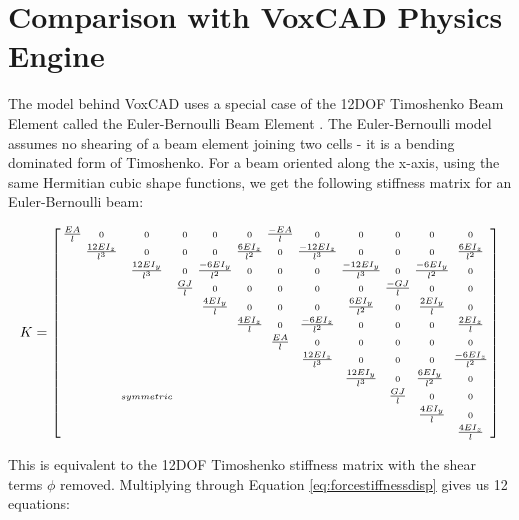 {\section{Comparison with VoxCAD Physics Engine}

The model behind VoxCAD uses a special case of the 12DOF Timoshenko Beam Element called the Euler-Bernoulli Beam Element \cite{Hiller2014a}.  The Euler-Bernoulli model assumes no shearing of a beam element joining two cells - it is a bending dominated form of Timoshenko.  For a beam oriented along the x-axis, using the same Hermitian cubic shape functions, we get the following stiffness matrix for an Euler-Bernoulli beam:

\[ K =  \small {\left[ \begin{smallmatrix}
\tfrac{EA}{l} & 0 & 0 & 0 & 0 & 0 & \tfrac{-EA}{l} & 0 & 0 & 0 & 0 & 0\\
 & \tfrac{12EI_z}{l^3} & 0 & 0 & 0 & \tfrac{6EI_z}{l^2} & 0 & \tfrac{-12EI_z}{l^3} & 0 & 0 & 0 & \tfrac{6EI_z}{l^2}\\
 &  & \tfrac{12EI_y}{l^3} & 0 & \tfrac{-6EI_y}{l^2} & 0 & 0 & 0 & \tfrac{-12EI_y}{l^3} & 0 & \tfrac{-6EI_y}{l^2} & 0\\
 &  &  &  \tfrac{GJ}{l} &  0 &  0 &  0 &  0 &  0 & \tfrac{-GJ}{l} & 0 & 0\\
 &  &  &  & \tfrac{4EI_y}{l} & 0 & 0 & 0 & \tfrac{6EI_y}{l^2} & 0 & \tfrac{2EI_y}{l} & 0\\
 &  &  &  &  & \tfrac{4EI_z}{l} & 0 & \tfrac{-6EI_z}{l^2} & 0 & 0 & 0 & \tfrac{2EI_z}{l}\\
 &  &  &  &  &  & \tfrac{EA}{l}  & 0 & 0 & 0 & 0 & 0\\
 &  &  &  &  &  &  & \tfrac{12EI_z}{l^3} & 0 & 0 & 0 & \tfrac{-6EI_z}{l^2}\\
 &  &  &  &  &  &  &  & \tfrac{12EI_y}{l^3} & 0 & \tfrac{6EI_y}{l^2}\ & 0\\
 &  & symmetric &  &  &  &  &  &  & \tfrac{GJ}{l} & 0 & 0\\
 &  &  &  &  &  &  &  &  &  & \tfrac{4EI_y}{l} & 0\\
  &  &  &  &  &  &  &  &  &  &  & \tfrac{4EI_z}{l}\\
 \end{smallmatrix} \right] } \]
 
 This is equivalent to the 12DOF Timoshenko stiffness matrix with the shear terms $\phi$ removed.  Multiplying through Equation \ref{eq:forcestiffnessdisp} gives us 12 equations:

}

